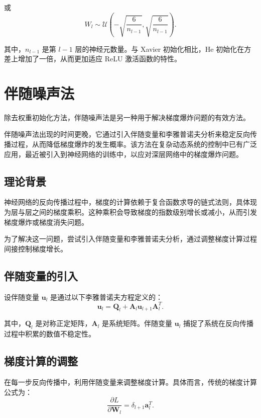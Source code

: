 或
\begin{equation}
  W_l \sim \mathcal{U}\left(-\sqrt{\frac{6}{n_{l-1}}}, \sqrt{\frac{6}{n_{l-1}}}\right).
\end{equation}

其中，\( n_{l-1} \) 是第 \( l-1 \) 层的神经元数量。与 Xavier 初始化相比，He 初始化在方差上增加了一倍，从而更加适应 ReLU 激活函数的特性。

\section{伴随噪声法}

除去权重初始化方法，伴随噪声法是另一种用于解决梯度爆炸问题的有效方法。

伴随噪声法出现的时间更晚，它通过引入伴随变量和李雅普诺夫分析来稳定反向传播过程，从而降低梯度爆炸的发生概率。该方法在复杂动态系统的控制中已有广泛应用，最近被引入到神经网络的训练中，以应对深层网络中的梯度爆炸问题。

\subsection{理论背景}

神经网络的反向传播过程中，梯度的计算依赖于复合函数求导的链式法则，具体现为层与层之间的梯度乘积。这种乘积会导致梯度的指数级别增长或减小，从而引发梯度爆炸或梯度消失问题。

为了解决这一问题，尝试引入伴随变量和李雅普诺夫分析，通过调整梯度计算过程间接控制梯度增长。

\subsection{伴随变量的引入}

设伴随变量 \( \mathbf{u}_l \) 是通过以下李雅普诺夫方程定义的：
\begin{equation}
  \mathbf{u}_l = \mathbf{Q}_l + \mathbf{A}_l \mathbf{u}_{l+1} \mathbf{A}_l^T.
\end{equation}

其中，\( \mathbf{Q}_l \) 是对称正定矩阵，\( \mathbf{A}_l \) 是系统矩阵。伴随变量 \( \mathbf{u}_l \) 捕捉了系统在反向传播过程中积累的数值不稳定性。

\subsection{梯度计算的调整}

在每一步反向传播中，利用伴随变量来调整梯度计算。具体而言，传统的梯度计算公式为：
\begin{equation}
  \frac{\partial L}{\partial \mathbf{W}_l} = \delta_{l+1} \mathbf{a}_l^T.
\end{equation}

